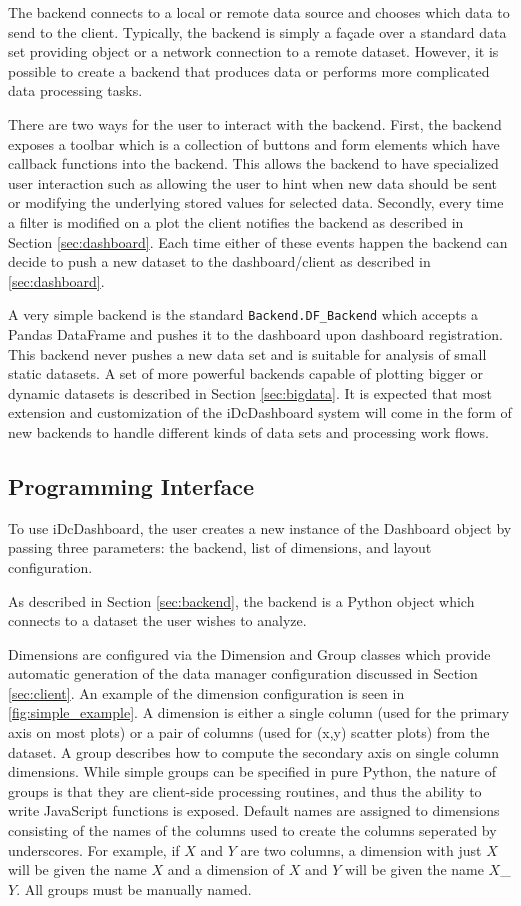 \documentclass[letter,twocolumn]{article}
\begin{document}
The backend connects to a local or remote data source and chooses which data to send to the client.
Typically, the backend is simply a fa\c{c}ade over a standard data set providing object or a network connection to a remote dataset.  
However, it is possible to create a backend that produces data or performs more complicated data processing tasks.

There are two ways for the user to interact with the backend.
First, the backend exposes a toolbar which is a collection of buttons and form elements which have callback functions into the backend.
This allows the backend to have specialized user interaction such as allowing the user to hint when new data should be sent or modifying the underlying stored values for selected data.
Secondly, every time a filter is modified on a plot the client notifies the backend as described in Section \ref{sec:dashboard}.
Each time either of these events happen the backend can decide to push a new dataset to the dashboard/client as described in \ref{sec:dashboard}.

A very simple backend is the standard {\tt Backend.DF\_Backend} which accepts a Pandas DataFrame and pushes it to the dashboard upon dashboard registration.
This backend never pushes a new data set and is suitable for analysis of small static datasets.
A set of more powerful backends capable of plotting bigger or dynamic datasets is described in Section \ref{sec:bigdata}.
It is expected that most extension and customization of the iDcDashboard system will come in the form of new backends to handle different kinds of data sets and processing work flows.

\subsection{Programming Interface}\label{sec:api}

To use iDcDashboard, the user creates a new instance of the Dashboard object by passing three parameters: the backend, list of dimensions, and layout configuration.

As described in Section \ref{sec:backend}, the backend is a Python object which connects to a dataset the user wishes to analyze.

Dimensions are configured via the Dimension and Group classes which provide automatic generation of the data manager configuration discussed in Section \ref{sec:client}.
An example of the dimension configuration is seen in \ref{fig:simple_example}.
A dimension is either a single column (used for the primary axis on most plots) or a pair of columns (used for (x,y) scatter plots) from the dataset.
A group describes how to compute the secondary axis on single column dimensions.
While simple groups can be specified in pure Python, the nature of groups is that they are client-side processing routines, and thus the ability to write JavaScript functions is exposed.
Default names are assigned to dimensions consisting of the names of the columns used to create the columns seperated by underscores.
For example, if $X$ and $Y$ are two columns, a dimension with just $X$ will be given the name $X$ and a dimension of $X$ and $Y$ will be given the name $X$\_$Y$.
All groups must be manually named.
\end{document}
